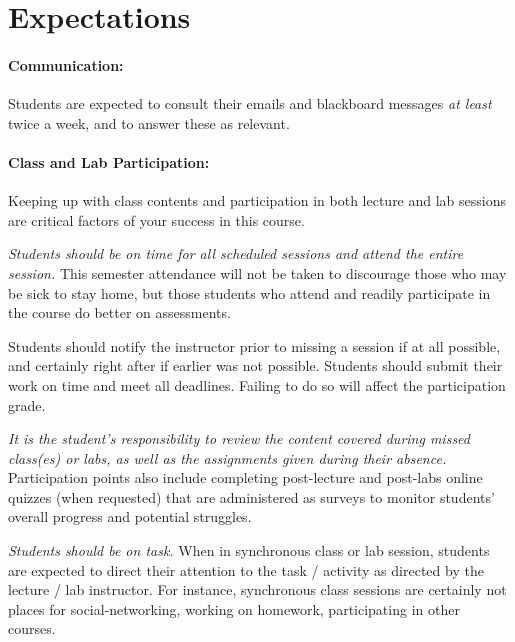 \documentclass[12pt]{scrartcl}
\begin{document}
\section{Expectations}

\paragraph{Communication:} Students are expected to consult their emails and blackboard messages \textit{at least} twice a week, and to answer these as relevant. 

\paragraph{Class and Lab Participation:} Keeping up with class contents and participation in both lecture and lab sessions are critical factors of your success in this course. 

\textit{Students should be on time for all scheduled sessions and attend the entire session.} 
This semester attendance will not be taken to discourage those who may be sick to stay home, 
but those students who attend and readily participate in the course do better on assessments.

Students should notify the instructor prior to missing a session if at all possible, and certainly right after if earlier was not possible. 
Students should submit their work on time and meet all deadlines. Failing to do so will affect the participation grade.


\textit{It is the student's responsibility to review the content covered during missed class(es) or labs, as well as the assignments given during their absence.}
Participation points also include completing post-lecture and post-labs online quizzes (when requested) that are administered as surveys to monitor students’ overall progress and potential struggles.

\textit{Students should be on task.} 
When in synchronous class or lab session, students are expected to direct their attention to the task / activity as directed by the lecture / lab instructor. 
For instance, synchronous class sessions are certainly not places for social-networking, working on homework, participating in other courses.
\end{document}
